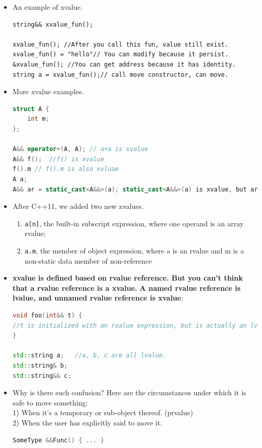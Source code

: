 \documentclass[a4paper,11pt,twoside]{book}
\begin{document}
\begin{itemize}

    \item An example of xvalue.
\begin{lstlisting}
string&& xvalue_fun();

xvalue_fun(); //After you call this fun, value still exist. 
xvalue_fun() = "hello"// You can modify because it persist.
&xvalue_fun(); //You can get address because it has identity.
string a = xvalue_fun();// call move constructor, can move.
\end{lstlisting}
	
	\item More xvalue examples.
\begin{lstlisting}[frame=single, language=c++, mathescape=true]
struct A {
	int m;
};
	
A&& operator+(A, A); // a+a is xvalue
A&& f();  //f() is xvalue
f().m // f().m is also xvluae
A a;
A&& ar = static_cast<A&&>(a); static_cast<A&&>(a) is xvalue, but ar is lvalue
\end{lstlisting}
	
	\item After C++11, we added two new xvalues.
	\begin{enumerate}
		\item \texttt{a[n]}, the built-in subscript expression, where one operand is an array rvalue;
		\item \texttt{a.m}, the member of object expression, where a is an rvalue and m is a non-static data member of non-reference
	\end{enumerate}

	\item \textbf{xvalue is defined based on rvalue reference. But you can't think that a rvalue reference is a xvalue. }  \textbf{A named rvalue reference is lvalue, and unnamed rvalue reference is xvalue};
	
\begin{lstlisting}[frame=single, language=c++,mathescape=true]
void foo(int&& t) {
//t is initialized with an rvalue expression, but is actually an lvalue expression itself
}
	
std::string a;   //a, b, c are all lvalue.
std::string& b;
std::string&& c;
\end{lstlisting}
	

	\item Why is there such confusion? Here are the circumstances under which it is safe to move something:\\
	1) When it's a temporary or sub-object thereof. (prvalue) \\
	2) When the user has explicitly said to move it.
\begin{lstlisting}[frame=single, language=c++]
SomeType &&Func() { ... }
	

\end{lstlisting}
\end{itemize}
\end{document}
